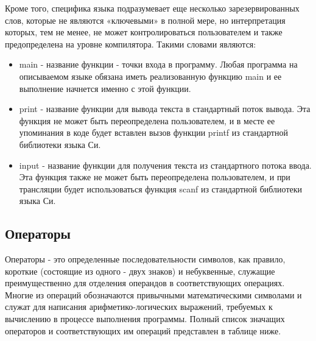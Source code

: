 Кроме того, специфика языка подразумевает еще несколько зарезервированных слов, которые не являются «ключевыми» в полной мере, но интерпретация которых, тем не менее, не может контролироваться пользователем и также предопределена на уровне компилятора. Такими словами являются:

\begin{itemize}
    \item main - название функции - точки входа в программу. Любая программа на описываемом языке обязана иметь реализованную функцию main и ее выполнение начнется именно с этой функции.
    \item print - название функции для вывода текста в стандартный поток вывода. Эта функция не может быть переопределена пользователем, и в месте ее упоминания в коде будет вставлен вызов функции printf из стандартной библиотеки языка Си.
    \item input - название функции для получения текста из стандартного потока ввода. Эта функция также не может быть переопределена пользователем, и при трансляции будет использоваться функция scanf из стандартной библиотеки языка Си.
\end{itemize}

\subsection{Операторы}

Операторы - это определенные последовательности символов, как правило, короткие (состоящие из одного - двух знаков) и небуквенные, служащие преимущественно для отделения операндов в соответствующих операциях. Многие из операций обозначаются привычными математическими символами и служат для написания арифметико-логических выражений, требуемых к вычислению в процессе выполнения программы. Полный список значащих операторов и соответствующих им операций представлен в таблице ниже.

